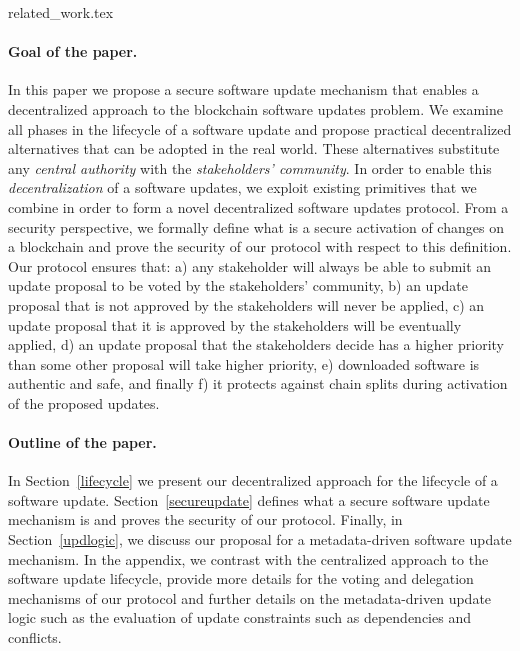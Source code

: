 {related_work.tex}
\paragraph{Goal of the paper.} In this paper we propose a secure software update mechanism that enables a decentralized approach to the blockchain software updates problem. We examine all phases in the lifecycle of a software update and propose practical decentralized alternatives that can be adopted in the real world. These alternatives substitute any \emph{central authority} with the \emph{stakeholders' community}. In order to enable this \emph{decentralization} of a software updates, we exploit existing primitives that we combine in order to form a novel decentralized software updates protocol. From a security perspective, we formally define what is a secure activation of changes on a blockchain and prove the security of our protocol with respect to this definition.  Our protocol ensures that:
a) any stakeholder will always be able to submit an update proposal to be voted by the stakeholders' community, b) an update proposal that is not approved by the stakeholders
 will never be applied, c) an update proposal that it is approved by the stakeholders will be eventually applied, d) an update proposal that the stakeholders decide has a higher priority than some other proposal will take higher priority, e) downloaded software is authentic and safe, and finally f) it protects against chain splits during activation of the proposed updates.

\paragraph{Outline of the paper.} In Section~\ref{lifecycle} we present our decentralized approach for the lifecycle of a software update. Section~\ref{secureupdate} defines what a secure software update mechanism is and proves the security of our protocol. Finally, in Section~\ref{updlogic}, we discuss our proposal for a metadata-driven software update mechanism. In the appendix, we contrast with the centralized approach to the software update lifecycle, provide more details for the voting and delegation mechanisms of our protocol and further details on the metadata-driven update logic such as the evaluation of update constraints such as dependencies and conflicts.

